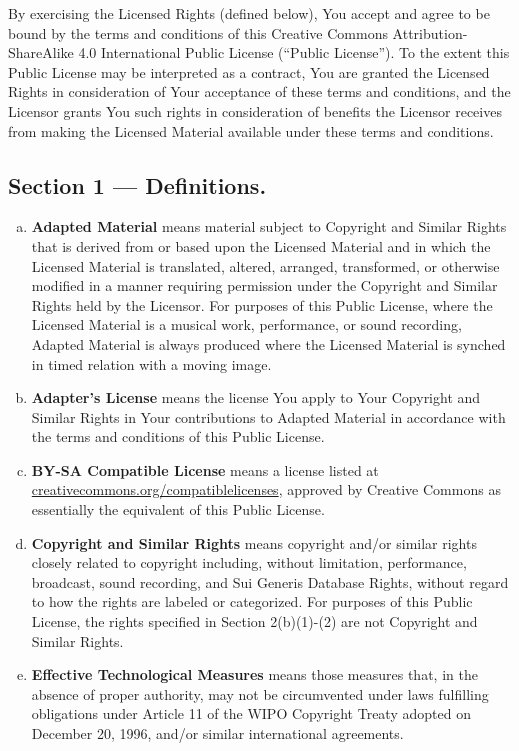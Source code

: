 {\small%
By exercising the Licensed Rights (defined below), You accept and agree to be bound by the terms and conditions of this Creative Commons Attribution-ShareAlike 4.0 International Public License (``Public License''). To the extent this Public License may be interpreted as a contract, You are granted the Licensed Rights in consideration of Your acceptance of these terms and conditions, and the Licensor grants You such rights in consideration of benefits the Licensor receives from making the Licensed Material available under these terms and conditions.

\subsection*{Section 1 --- Definitions.}

\begin{enumerate}[a.]
\item \textbf{Adapted Material} means material subject to Copyright and Similar Rights that is derived from or based upon the Licensed Material and in which the Licensed Material is translated, altered, arranged, transformed, or otherwise modified in a manner requiring permission under the Copyright and Similar Rights held by the Licensor. For purposes of this Public License, where the Licensed Material is a musical work, performance, or sound recording, Adapted Material is always produced where the Licensed Material is synched in timed relation with a moving image.
\item \textbf{Adapter's License} means the license You apply to Your Copyright and Similar Rights in Your contributions to Adapted Material in accordance with the terms and conditions of this Public License.
\item \textbf{BY-SA Compatible License} means a license listed at\\ \href{https://creativecommons.org/compatiblelicenses}{creativecommons.org/compatiblelicenses}, approved by Creative Commons as essentially the equivalent of this Public License.
\item \textbf{Copyright and Similar Rights} means copyright and/or similar rights closely related to copyright including, without limitation, performance, broadcast, sound recording, and Sui Generis Database Rights, without regard to how the rights are labeled or categorized. For purposes of this Public License, the rights specified in Section 2(b)(1)-(2) are not Copyright and Similar Rights.
\item \textbf{Effective Technological Measures} means those measures that, in the absence of proper authority, may not be circumvented under laws fulfilling obligations under Article 11 of the WIPO Copyright Treaty adopted on December 20, 1996, and/or similar international agreements.

\end{enumerate}}
